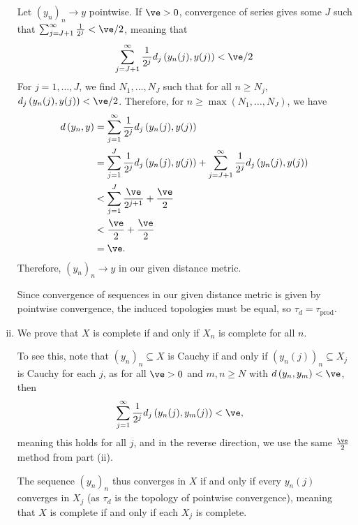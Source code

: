 \documentclass[10pt]{mypackage}
\begin{document}
\begin{enumerate}[(i)]
    Let $\left( y_n \right)_n\rightarrow y$ pointwise. If $\ve > 0$, convergence of series gives some $J$ such that $\sum_{j=J+1}^{\infty}\frac{1}{2^{j}} < \ve/2$, meaning that
    \begin{align*}
       \sum_{j=J+1}^{\infty}\frac{1}{2^{j}}d_j\left( y_n(j),y(j) \right) < \ve/2
    \end{align*}
    For $j = 1,\dots,J$, we find $N_1,\dots,N_J$ such that for all $n \geq N_j$, $d_j\left( y_n(j),y(j) \right) < \ve/2$. Therefore, for $n\geq \max\left( N_1,\dots,N_J \right)$, we have
    \begin{align*}
      d\left( y_n,y \right) &= \sum_{j=1}^{\infty}\frac{1}{2^{j}}d_j\left( y_n(j),y(j) \right)\\
                            &= \sum_{j=1}^{J} \frac{1}{2^{j}}d_j\left( y_n(j),y(j) \right) + \sum_{j=J+1}^{\infty}\frac{1}{2^{j}}d_j\left( y_n(j),y(j) \right)\\
                            &< \sum_{j=1}^{J} \frac{\ve}{2^{j+1}} + \frac{\ve}{2}\\
                            &< \frac{\ve}{2} + \frac{\ve}{2}\\
                            &= \ve.
    \end{align*}
    Therefore, $\left( y_n \right)_n\rightarrow y$ in our given distance metric.\newline

    Since convergence of sequences in our given distance metric is given by pointwise convergence, the induced topologies must be equal, so $\tau_{d} = \tau_{\text{prod}}$.
  \item We prove that $X$ is complete if and only if $X_n$ is complete for all $n$.\newline

    To see this, note that $\left( y_n \right)_n\subseteq X$ is Cauchy if and only if $\left( y_n(j) \right)_n\subseteq X_j$ is Cauchy for each $j$, as for all $\ve > 0$ and $m,n\geq N$ with $d\left( y_n,y_m \right) < \ve$, then
    \begin{align*}
      \sum_{j=1}^{\infty}\frac{1}{2^{j}} d_j\left( y_n(j),y_m(j) \right) &< \ve,
    \end{align*}
    meaning this holds for all $j$, and in the reverse direction, we use the same $\frac{\ve}{2}$ method from part (ii).\newline

    The sequence $\left( y_n \right)_n$ thus converges in $X$ if and only if every $y_n(j)$ converges in $X_j$ (as $\tau_d$ is the topology of pointwise convergence), meaning that $X$ is complete if and only if each $X_j$ is complete.
\end{enumerate}
\end{document}
